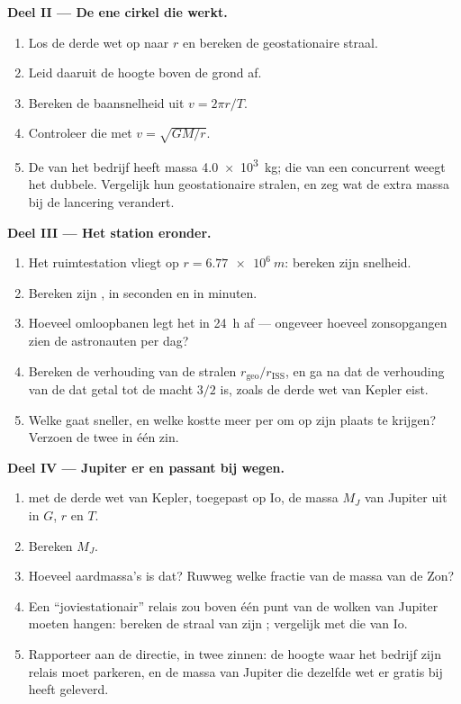 \begin{problem}
\medskip
\noindent\textbf{Deel II --- De ene cirkel die werkt.}
\begin{enumerate}[resume]
  \item Los de derde wet op naar $r$ en bereken de geostationaire straal.
  \item Leid daaruit de hoogte boven de grond af.
  \item Bereken de baansnelheid uit $v = 2\pi r/T$.
  \item Controleer die met $v = \sqrt{GM/r}$.
  \item De  van het bedrijf heeft massa \qty{4.0e3}{kg}; die van een
        concurrent weegt het dubbele. Vergelijk hun geostationaire stralen, en
        zeg wat de extra massa bij de lancering verandert.
\end{enumerate}

\medskip
\noindent\textbf{Deel III --- Het station eronder.}
\begin{enumerate}[resume]
  \item Het ruimtestation vliegt op $r = \qty{6.77e6}{m}$: bereken zijn
        snelheid.
  \item Bereken zijn , in seconden en in minuten.
  \item Hoeveel omloopbanen legt het in \qty{24}{h} af --- ongeveer hoeveel
        zonsopgangen zien de astronauten per dag?
  \item Bereken de verhouding van de stralen
        $r_{\text{geo}}/r_{\text{ISS}}$, en ga na dat de verhouding van de
         dat getal tot de macht $3/2$ is, zoals de derde wet van
        Kepler eist.
  \item Welke  gaat sneller, en welke kostte meer  per
         om op zijn plaats te krijgen? Verzoen de twee in één zin.
\end{enumerate}

\medskip
\noindent\textbf{Deel IV --- Jupiter er en passant bij wegen.}
\begin{enumerate}[resume]
  \item {} met de derde wet van Kepler, toegepast op Io, de massa $M_J$ van
        Jupiter uit in $G$, $r$ en $T$.
  \item Bereken $M_J$.
  \item Hoeveel aardmassa's is dat? Ruwweg welke fractie van de massa van de
        Zon?
  \item Een ``joviestationair'' relais zou boven één punt van de wolken van
        Jupiter moeten hangen: bereken de straal van zijn ;
        vergelijk met die van Io.
  \item Rapporteer aan de directie, in twee zinnen: de hoogte waar het bedrijf
        zijn relais moet parkeren, en de massa van Jupiter die dezelfde wet er
        gratis bij heeft geleverd.
\end{enumerate}
\end{problem}
